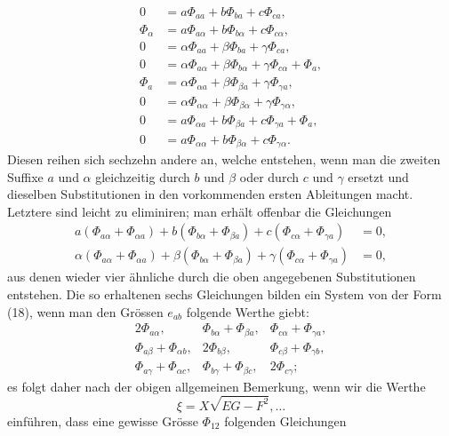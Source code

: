 \documentclass[11pt,a4paper,leqno]{article}
\begin{document}
\begin{equation}\tag{19}
\begin{aligned}
0&=a\Phi_{aa}+b\Phi_{ba}+c\Phi_{ca},\\
\Phi_\alpha&=a\Phi_{a\alpha}+b\Phi_{b\alpha}+c\Phi_{c\alpha},\\
0&=\alpha\Phi_{aa}+\beta\Phi_{ba}+\gamma\Phi_{ca},\\
0&=\alpha\Phi_{a\alpha}+\beta\Phi_{b\alpha}+\gamma\Phi_{c\alpha}+\Phi_a,\\
\Phi_a&=\alpha\Phi_{\alpha a}+\beta\Phi_{\beta a}+\gamma\Phi_{\gamma a},\\
0&=\alpha\Phi_{\alpha\alpha}+\beta\Phi_{\beta\alpha}+\gamma\Phi_{\gamma\alpha},\\
0&=a\Phi_{\alpha a}+b\Phi_{\beta a}+c\Phi_{\gamma a}+\Phi_a,\\
0&=a\Phi_{\alpha\alpha}+b\Phi_{\beta\alpha}+c\Phi_{\gamma\alpha}.
\end{aligned}
\end{equation}
Diesen reihen sich sechzehn andere an, welche entstehen, wenn
man die zweiten Suffixe $a$ und $\alpha$ gleichzeitig durch $b$ und $\beta$
oder durch $c$ und $\gamma$ ersetzt und dieselben Substitutionen in den
vorkommenden ersten Ableitungen macht. Letztere sind leicht
zu eliminiren; man erhält offenbar die Gleichungen
\[
\begin{aligned}
a(\Phi_{a\alpha}+\Phi_{\alpha a})
+b(\Phi_{b\alpha}+\Phi_{\beta a})
+c(\Phi_{c\alpha}+\Phi_{\gamma a})&=0,\\
\alpha(\Phi_{a\alpha}+\Phi_{\alpha a})
+\beta(\Phi_{b\alpha}+\Phi_{\beta a})
+\gamma(\Phi_{c\alpha}+\Phi_{\gamma a})&=0,
\end{aligned}
\]
aus denen wieder vier ähnliche durch die oben angegebenen
Substitutionen entstehen. Die so erhaltenen sechs Gleichungen
bilden ein System von der Form (18), wenn man den Grössen
$e_{ab}$ folgende Werthe giebt:
\[
\begin{array}{ccc}
2\Phi_{a\alpha},&\Phi_{b\alpha}+\Phi_{\beta a},&\Phi_{c\alpha}+\Phi_{\gamma a},\\
\Phi_{a\beta}+\Phi_{\alpha b},&2\Phi_{b\beta},&\Phi_{c\beta}+\Phi_{\gamma b},\\
\Phi_{a\gamma}+\Phi_{\alpha c},&\Phi_{b\gamma}+\Phi_{\beta c},&2\Phi_{c\gamma};
\end{array}
\]
es folgt daher nach der obigen allgemeinen Bemerkung, wenn
wir die Werthe
\[
\xi=X\sqrt{EG-F^2},\ldots
\]
einführen, dass eine gewisse Grösse $\Phi_{12}$ folgenden Gleichungen
\end{document}
